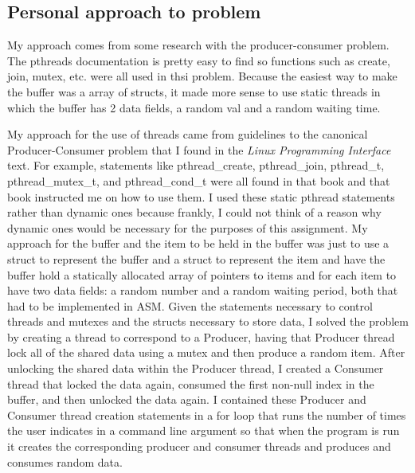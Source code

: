 \documentclass[letterpaper,10pt,titlepage]{article}
\begin{document}
\subsection{Personal approach to problem}
My approach comes from some research with the producer-consumer problem.  The pthreads documentation is pretty easy to find so functions such as create, join, mutex, etc. were all used in thsi problem.  Because the easiest way to make the buffer was a array of structs, it made more sense to use static threads in which the buffer has 2 data fields, a random val and a random waiting time.  

My approach for the use of threads came from guidelines to the canonical Producer-Consumer problem that I found in the \emph{Linux Programming Interface} text. For example, statements like pthread\_create, pthread\_join, pthread\_t, pthread\_mutex\_t, and pthread\_cond\_t were all found in that book and that book instructed me on how to use them. I used these static pthread statements rather than dynamic ones because frankly, I could not think of a reason why dynamic ones would be necessary for the purposes of this assignment. My approach for the buffer and the item to be held in the buffer was just to use a struct to represent the buffer and a struct to represent the item and have the buffer hold a statically allocated array of pointers to items and for each item to have two data fields: a random number and a random waiting period, both that had to be implemented in ASM. Given the statements necessary to control threads and mutexes and the structs necessary to store data, I solved the problem by creating a thread to correspond to a Producer, having that Producer thread lock all of the shared data using a mutex and then produce a random item. After unlocking the shared data within the Producer thread, I created a Consumer thread that locked the data again, consumed the first non-null index in the buffer, and then unlocked the data again. I contained these Producer and Consumer thread creation statements in a for loop that runs the number of times the user indicates in a command line argument so that when the program is run it creates the corresponding producer and consumer threads and produces and consumes random data. 
\end{document}
